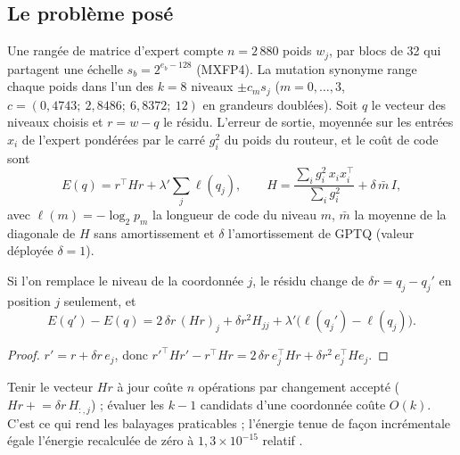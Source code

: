 \subsection{Le problème posé}\label{t3mim:sec:p5-probleme}

Une rangée de matrice d'expert compte $n = 2\,880$ poids $w_j$, par blocs de 32 qui partagent une échelle $s_b = 2^{e_b - 128}$ (MXFP4). La mutation synonyme range chaque poids dans l'un des $k = 8$ niveaux $\pm c_m s_j$ ($m = 0, \dots, 3$, $c = (0{,}4743;\ 2{,}8486;\ 6{,}8372;\ 12)$ en grandeurs doublées). Soit $q$ le vecteur des niveaux choisis et $r = w - q$ le résidu. L'erreur de sortie, moyennée sur les entrées $x_i$ de l'expert pondérées par le carré $g_i^2$ du poids du routeur, et le coût de code sont
\begin{equation}\label{t3mim:eq:p5-energie}
E(q) = r^\top H r + \lambda' \sum_j \ell(q_j), \qquad H = \frac{\sum_i g_i^2\,x_i x_i^\top}{\sum_i g_i^2} + \delta\,\bar m\,I,
\end{equation}
avec $\ell(m) = -\log_2 p_m$ la longueur de code du niveau $m$, $\bar m$ la moyenne de la diagonale de $H$ sans amortissement et $\delta$ l'amortissement de GPTQ (valeur déployée $\delta = 1$).

\begin{lemme}\label{t3mim:lem:variation}
Si l'on remplace le niveau de la coordonnée $j$, le résidu change de $\delta r = q_j - q_j'$ en position $j$ seulement, et
\[
E(q') - E(q) = 2\,\delta r\,(Hr)_j + \delta r^2 H_{jj} + \lambda'\bigl(\ell(q_j') - \ell(q_j)\bigr).
\]
\end{lemme}
\begin{proof}
$r' = r + \delta r\,e_j$, donc $r'^\top H r' - r^\top H r = 2\,\delta r\,e_j^\top H r + \delta r^2\,e_j^\top H e_j$.
\end{proof}
Tenir le vecteur $Hr$ à jour coûte $n$ opérations par changement accepté ($Hr \mathrel{+}= \delta r\,H_{:,j}$) ; évaluer les $k - 1$ candidats d'une coordonnée coûte $O(k)$. C'est ce qui rend les balayages praticables ; l'énergie tenue de façon incrémentale égale l'énergie recalculée de zéro à $1{,}3 \times 10^{-15}$ relatif \mes.


